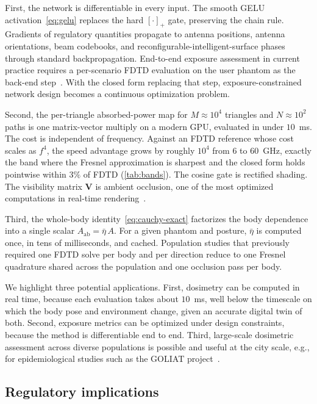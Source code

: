 \documentclass[journal,twocolumn,10pt]{IEEEtran}
\newcommand{\Aab}{A_{\mathrm{ab}}}
\begin{document}
First, the network is differentiable in every input. The smooth
\gls{GELU} activation~\eqref{eq:gelu} replaces the hard $[\cdot]_+$
gate, preserving the chain rule. Gradients of
regulatory quantities propagate to antenna positions, antenna
orientations, beam codebooks, and reconfigurable-intelligent-surface
phases through standard backpropagation.
End-to-end exposure assessment in current practice requires a
per-scenario FDTD evaluation on the user phantom as the back-end
step~\cite{Wydaeghe2022access,Wydaeghe2026npj}. With the closed form
replacing that step, exposure-constrained network design becomes a
continuous optimization problem.

Second, the per-triangle absorbed-power map for $M \approx 10^4$
triangles and $N \approx 10^2$ paths is one matrix-vector multiply on
a modern GPU, evaluated in under $10$~ms. The cost is independent of
frequency. Against an FDTD reference whose cost scales as $f^4$, the
speed advantage grows by roughly $10^4$ from $6$ to $60$~GHz, exactly
the band where the Fresnel approximation is sharpest and the closed
form holds pointwise within $3\%$ of FDTD (\cref{tab:bands}). The
cosine gate is rectified shading. The visibility matrix $\mathbf{V}$
is ambient occlusion, one of the most optimized computations in
real-time rendering~\cite{AkenineMoller2018}.

Third, the whole-body identity~\eqref{eq:cauchy-exact} factorizes the
body dependence into a single scalar $\Aab = \bar\eta\,A$. For a
given phantom and posture, $\bar\eta$ is computed once, in tens of
milliseconds, and cached. Population studies that previously
required one FDTD solve per body and per direction reduce to one
Fresnel quadrature shared across the population and one occlusion
pass per body.

We highlight three potential applications. First, dosimetry can be
computed in real time, because each evaluation takes about $10$~ms,
well below the timescale on which the body pose and environment
change, given an accurate digital twin of both. Second, exposure
metrics can be optimized under design constraints, because the method
is differentiable end to end. Third, large-scale dosimetric assessment
across diverse populations is possible and useful at the city scale,
e.g., for epidemiological studies such as the GOLIAT
project~\cite{Goliat}.

\subsection{Regulatory implications}\label{subsec:disc-regulatory}
\end{document}
